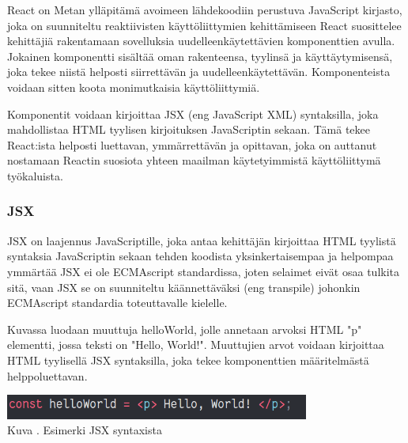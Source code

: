 





React on Metan ylläpitämä avoimeen lähdekoodiin perustuva JavaScript kirjasto,
joka on suunniteltu reaktiivisten käyttöliittymien kehittämiseen
React suosittelee kehittäjiä rakentamaan sovelluksia uudelleenkäytettävien komponenttien avulla.
Jokainen komponentti sisältää oman rakenteensa, tyylinsä ja käyttäytymisensä, joka tekee niistä helposti siirrettävän ja uudelleenkäytettävän.
Komponenteista voidaan sitten koota monimutkaisia käyttöliittymiä. 
\medskip


Komponentit voidaan kirjoittaa JSX (eng JavaScript XML) syntaksilla, joka mahdollistaa HTML tyylisen kirjoituksen JavaScriptin sekaan.
Tämä tekee React:ista helposti luettavan, ymmärrettävän ja opittavan,
joka on auttanut nostamaan Reactin suosiota yhteen maailman käytetyimmistä käyttöliittymä työkaluista.
\medskip









\subsubsection{JSX}








JSX on laajennus JavaScriptille, joka antaa kehittäjän kirjoittaa HTML tyylistä syntaksia JavaScriptin sekaan
tehden koodista yksinkertaisempaa ja helpompaa ymmärtää
JSX ei ole ECMAscript standardissa, joten selaimet eivät osaa tulkita sitä,
vaan JSX se on suunniteltu käännettäväksi (eng transpile) johonkin ECMAscript standardia toteuttavalle kielelle.
\medskip



Kuvassa \nextImageCount{} luodaan muuttuja helloWorld, jolle annetaan arvoksi HTML "p"{} elementti, jossa teksti on "Hello, World!"{}.
Muuttujien arvot voidaan kirjoittaa HTML tyylisellä JSX syntaksilla, 
joka tekee komponenttien määritelmästä helppoluettavan.
\medskip



\bigskip
\includegraphics[width=10cm]{src/public/oppar/pure_jsx_example.png}\\
Kuva \getImgCount {}. Esimerki JSX syntaxista
\medskip




